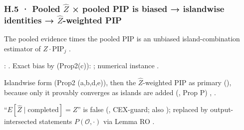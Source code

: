 \subsubsection*{H.5 · Pooled $\hat Z$ × pooled PIP is biased → islandwise identities → $\hat Z$-weighted PIP}
\begin{description}[leftmargin=1.3em,style=unboxed,font=\normalfont]
\item[\textbf{Claim.}] The pooled evidence times the pooled PIP is an unbiased island-combination estimator of $Z\cdot\mathrm{PIP}_j$ .
\item[\textbf{Failed.}] :  . Exact bias by  (Prop2(c)):  ; numerical instance .
\item[\textbf{Replacement.}] Islandwise form  (Prop2 (a,b,d,e)), then the $\hat Z$-weighted PIP as primary (), because only it provably converges as islands are added (, Prop P) , .
\item[\textbf{Related.}] ``$E[\hat Z\mid\text{completed}]=Z$'' is false (, CEX-guard; also ); replaced by output-intersected statements $P(\mathcal{O},\cdot)$ via Lemma RO .
\end{description}

